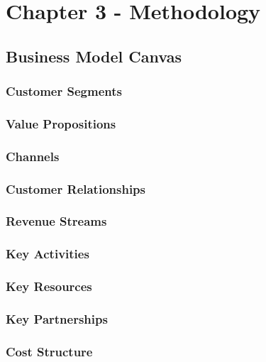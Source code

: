 \chapter{Chapter 3 - Methodology}

\section{Business Model Canvas}
\subsection{Customer Segments}
\subsection{Value Propositions}
\subsection{Channels}
\subsection{Customer Relationships}
\subsection{Revenue Streams}
\subsection{Key Activities}
\subsection{Key Resources}
\subsection{Key Partnerships}
\subsection{Cost Structure}